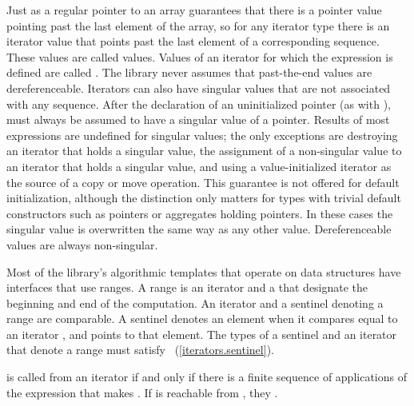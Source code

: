 \pnum
Just as a regular pointer to an array guarantees that there is a pointer value pointing past the last element
of the array, so for any iterator type there is an iterator value that points past the last element of a
corresponding sequence.
These values are called
values.
Values of an iterator
for which the expression
is defined are called
.
The library never assumes that past-the-end values are dereferenceable.
Iterators can also have singular values that are not associated with any
sequence.
\enterexample
After the declaration of an uninitialized pointer
(as with
),
must always be assumed to have a singular value of a pointer.
\exitexample
Results of most expressions are undefined for singular values;
the only exceptions are destroying an iterator that holds a singular value,
the assignment of a non-singular value to
an iterator that holds a singular value, and using a value-initialized iterator
as the source of a copy or move operation. \enternote This guarantee is not
offered for default initialization, although the distinction only matters for types
with trivial default constructors such as pointers or aggregates holding pointers.
\exitnote
In these cases the singular
value is overwritten the same way as any other value.
Dereferenceable
values are always non-singular.

\begin{addedblock}
\pnum
Most of the library's algorithmic templates that operate on data structures have
interfaces that use ranges. A range is an iterator and a  that designate
the beginning and end of the computation. An iterator and a sentinel denoting a range
are comparable. A sentinel denotes an element when it compares equal to an iterator
, and  points to that element. The types of a sentinel and an
iterator that denote a range must satisfy ~(\ref{iterators.sentinel}).
\end{addedblock}

\pnum
{}
is called
from an iterator
if and only if there is a finite sequence of applications of
the expression
that makes
.
If
is reachable from
,
they .

